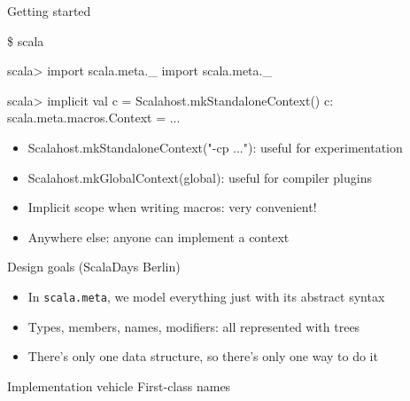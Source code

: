 \documentclass[svgnames,dvipsnames,hyperref={bookmarks=false},usepdftitle=false]{beamer}
\begin{document}

\begin{frame}[fragile]{Getting started}
\begin{semiverbatim}
\$ scala

scala> import scala.meta.\_
import scala.meta.\_

scala> implicit val c = Scalahost.mkStandaloneContext()
c: scala.meta.macros.Context = ...
\end{semiverbatim}

\vskip25pt
\begin{itemize}
\item<2-> Scalahost.mkStandaloneContext("-cp ..."): useful for experimentation
\item<3-> Scalahost.mkGlobalContext(global): useful for compiler plugins
\item<4-> Implicit scope when writing macros: very convenient!
\item<5-> Anywhere else: anyone can implement a context
\end{itemize}
\end{frame}

\begin{frame}{Design goals (ScalaDays Berlin)}
\begin{itemize}
\item In \texttt{scala.meta}, we model everything just with its abstract syntax
\item Types, members, names, modifiers: all represented with trees
\item There's only one data structure, so there's only one way to do it
\end{itemize}
\end{frame}

\begin{frame}{Implementation vehicle}
First-class names
\end{frame}
\end{document}
